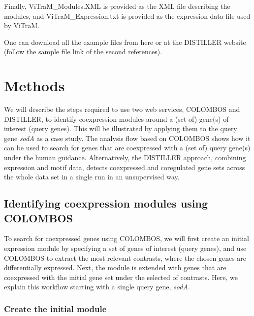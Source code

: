 Finally, ViTraM\_Modules.XML is provided as the XML file describing the modules, and ViTraM\_Expression.txt is provided as the expression data file used by ViTraM.

One can download all the example files from here \cite{DISTILLER-sample} or at the DISTILLER website \cite{DISTILLER} (follow the sample file link of the second references).






\section{Methods}

We will describe the steps required to use two web services, COLOMBOS and DISTILLER, to identify coexpression modules around a (set of) gene(s) of interest (query genes). This will be illustrated by applying them to the query gene \textit{sodA} as a case study.   The analysis flow based on COLOMBOS shows how it can be used to search for genes that are coexpressed with a (set of) query gene(s) under the human guidance.  Alternatively, the DISTILLER approach, combining expression and motif data, detects coexpressed and coregulated gene sets across the whole data set in a single run in an unsupervised way.


\subsection{Identifying coexpression modules using COLOMBOS}\label{sec:dist-module-colombos}

To search for coexpressed genes using COLOMBOS, we will first create an initial expression module by specifying a set of genes of interest (query genes), and use COLOMBOS to extract the most relevant contrasts, where the chosen genes are differentially expressed.  Next, the module is extended with genes that are coexpressed with the initial gene set under the selected of contrasts. Here, we explain this workflow starting with a single query gene, \textit{sodA}.


\subsubsection{Create the initial module}

